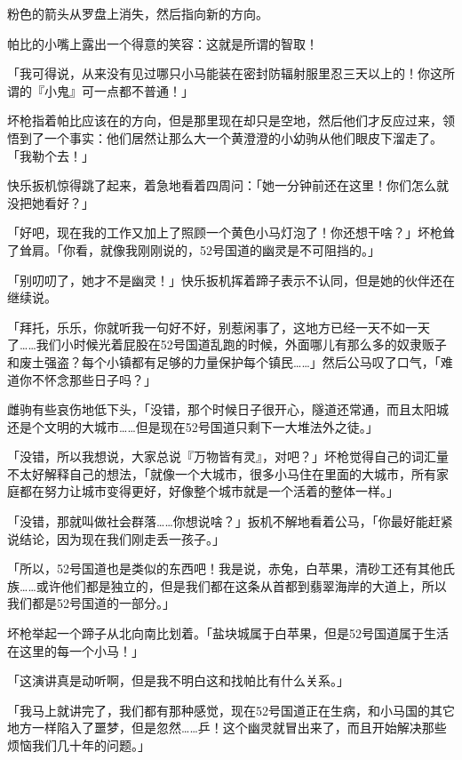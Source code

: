 粉色的箭头从罗盘上消失，然后指向新的方向。

帕比的小嘴上露出一个得意的笑容：这就是所谓的智取！

\horizonline


「我可得说，从来没有见过哪只小马能装在密封防辐射服里忍三天以上的！你这所谓的『小鬼』可一点都不普通！」

坏枪指着帕比应该在的方向，但是那里现在却只是空地，然后他们才反应过来，领悟到了一个事实：他们居然让那么大一个黄澄澄的小幼驹从他们眼皮下溜走了。「我勒个去！」

快乐扳机惊得跳了起来，着急地看着四周问：「她一分钟前还在这里！你们怎么就没把她看好？」

「好吧，现在我的工作又加上了照顾一个黄色小马灯泡了！你还想干啥？」坏枪耸了耸肩。「你看，就像我刚刚说的，52号国道的幽灵是不可阻挡的。」

「别叨叨了，她才不是幽灵！」快乐扳机挥着蹄子表示不认同，但是她的伙伴还在继续说。

「拜托，乐乐，你就听我一句好不好，别惹闲事了，这地方已经一天不如一天了……我们小时候光着屁股在52号国道乱跑的时候，外面哪儿有那么多的奴隶贩子和废土强盗？每个小镇都有足够的力量保护每个镇民……」然后公马叹了口气，「难道你不怀念那些日子吗？」

雌驹有些哀伤地低下头，「没错，那个时候日子很开心，隧道还常通，而且太阳城还是个文明的大城市……但是现在52号国道只剩下一大堆法外之徒。」

「没错，所以我想说，大家总说『万物皆有灵』，对吧？」坏枪觉得自己的词汇量不太好解释自己的想法，「就像一个大城市，很多小马住在里面的大城市，所有家庭都在努力让城市变得更好，好像整个城市就是一个活着的整体一样。」

「没错，那就叫做社会群落……你想说啥？」扳机不解地看着公马，「你最好能赶紧说结论，因为现在我们刚走丢一孩子。」

「所以，52号国道也是类似的东西吧！我是说，赤兔，白苹果，清砂工还有其他氏族……或许他们都是独立的，但是我们都在这条从首都到翡翠海岸的大道上，所以我们都是52号国道的一部分。」

坏枪举起一个蹄子从北向南比划着。「盐块城属于白苹果，但是52号国道属于生活在这里的每一个小马！」

「这演讲真是动听啊，但是我不明白这和找帕比有什么关系。」

「我马上就讲完了，我们都有那种感觉，现在52号国道正在生病，和小马国的其它地方一样陷入了噩梦，但是忽然……乒！这个幽灵就冒出来了，而且开始解决那些烦恼我们几十年的问题。」

